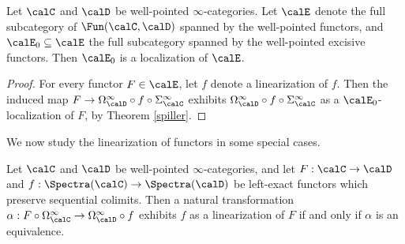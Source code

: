 \begin{corollary}\label{leftywing}
Let $\calC$ and $\calD$ be well-pointed $\infty$-categories.
Let $\calE$ denote the full subcategory of $\Fun(\calC, \calD)$ spanned by the
well-pointed functors, and $\calE_0 \subseteq \calE$ the full subcategory spanned
by the well-pointed excisive functors. Then $\calE_0$ is a localization of $\calE$.
\end{corollary}

\begin{proof}
For every functor $F \in \calE$, let $f$ denote a linearization of $f$. Then
the induced map $F \rightarrow \Omega^{\infty}_{\calD} \circ f \circ \Sigma^{\infty}_{\calC}$
exhibits $\Omega^{\infty}_{\calD} \circ f \circ \Sigma^{\infty}_{\calC}$ as a 
$\calE_0$-localization of $F$, by Theorem \ref{spiller}.
\end{proof}

We now study the linearization of functors in some special cases.

\begin{proposition}\label{kunst}
Let $\calC$ and $\calD$ be well-pointed $\infty$-categories, and let 
$F: \calC \rightarrow \calD$ and $f: \Spectra(\calC) \rightarrow \Spectra(\calD)$ be
left-exact functors which preserve sequential colimits.
Then a natural transformation
$\alpha: F \circ \Omega^{\infty}_{\calC} \rightarrow \Omega^{\infty}_{\calD} \circ f$
exhibits $f$ as a linearization of $F$ if and only if $\alpha$ is an equivalence.
\end{proposition}


